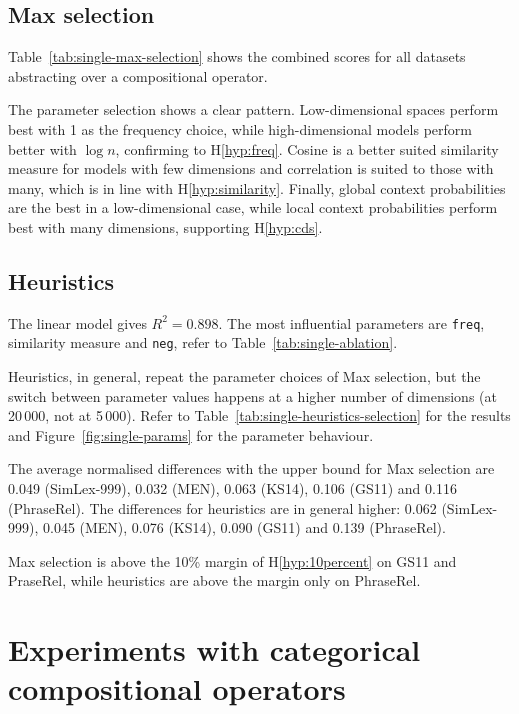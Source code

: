 \subsection{Max selection}
\label{sec:max-selection-single}

Table~\ref{tab:single-max-selection} shows the combined scores for all datasets abstracting over a compositional operator.



The parameter selection shows a clear pattern. Low-dimensional spaces perform best with 1 as the frequency choice, while high-dimensional models perform better with $\log n$, confirming to H\ref{hyp:freq}. Cosine is a better suited similarity measure for models with few dimensions and correlation is suited to those with many, which is in line with H\ref{hyp:similarity}. Finally, global context probabilities are the best in a low-dimensional case, while local context probabilities perform best with many dimensions, supporting H\ref{hyp:cds}.

\subsection{Heuristics}
\label{sec:heuristics-single}

The linear model gives $R^2 = 0.898$. The most influential parameters are \texttt{freq}, similarity measure and \texttt{neg}, refer to Table~\ref{tab:single-ablation}.

Heuristics, in general, repeat the parameter choices of Max selection, but the switch between parameter values happens at a higher number of dimensions (at 20\,000, not at 5\,000). Refer to Table~\ref{tab:single-heuristics-selection} for the results and Figure~\ref{fig:single-params} for the parameter behaviour.

The average normalised differences with the upper bound for Max selection are 0.049 (SimLex-999), 0.032 (MEN), 0.063 (KS14), 0.106 (GS11) and 0.116 (PhraseRel). The differences for heuristics are in general higher: 0.062 (SimLex-999), 0.045 (MEN), 0.076 (KS14), 0.090 (GS11) and 0.139 (PhraseRel).

Max selection is above the 10\% margin of H\ref{hyp:10percent} on GS11 and PraseRel, while heuristics are above the margin only on PhraseRel.

\section{Experiments with categorical compositional operators}
\label{sec:frob-comp-oper}

